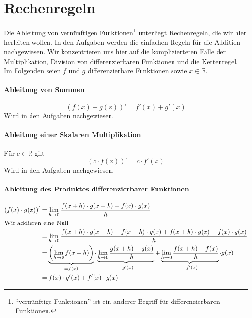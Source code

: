 \section{Rechenregeln}

Die Ableitung von vernünftigen Funktionen\footnote{"`vernünftige Funktionen"' ist ein anderer Begriff für differenzierbaren Funktionen.} unterliegt Rechenregeln, die wir hier herleiten wollen. In den Aufgaben werden die einfachen Regeln für die Addition nachgewiesen. Wir konzentrieren uns hier auf die komplizierteren Fälle der Multiplikation, Division von differenzierbaren Funktionen und die Kettenregel. Im Folgenden seien $f$ und $g$ differenzierbare Funktionen sowie $x\in \mathbb{R}$.

\paragraph{Ableitung von Summen}
\begin{equation}\label{eq:diff0}
\left(f(x)+g(x) \right)' = f'(x)+ g'(x)
\end{equation}
Wird in den Aufgaben nachgewiesen.

\paragraph{Ableitung einer Skalaren Multiplikation}
Für $c\in \mathbb{R}$ gilt
\begin{equation}\label{eq:diff1}
\left(c\cdot f(x)\right)' = c \cdot f'(x)
\end{equation}
Wird in den Aufgaben nachgewiesen.

\paragraph{Ableitung des Produktes differenzierbarer Funktionen}
\begin{equation}
\begin{split}\label{eq:diff2}
\left(f(x) \cdot g(x) \right)' &= \lim\limits_{h\rightarrow 0} \frac{f(x+h)\cdot g(x+h)-f(x)\cdot g(x)}{h} \\
\intertext{Wir addieren eine Null}
&= \lim\limits_{h\rightarrow 0} \frac{f(x+h)\cdot g(x+h) -f(x+h)\cdot g(x)+f(x+h)\cdot g(x) - f(x)\cdot g(x)}{h} \\
&= \underbrace{\left( \lim\limits_{h\rightarrow 0}f(x+h)\right)}_{=f(x)} \cdot 
\underbrace{\lim\limits_{h\rightarrow 0} \frac{g(x+h)-g(x)}{h}}_{=g'(x)} +\underbrace{\lim\limits_{h\rightarrow 0} \frac{f(x+h)-f(x)}{h}}_{=f'(x)} \cdot g(x)\\
&= f(x)\cdot g'(x) + f'(x)\cdot g(x)
\end{split}
\end{equation}

